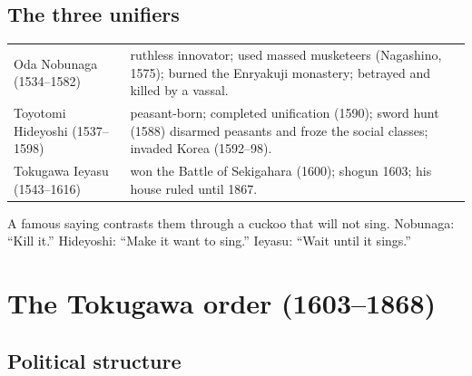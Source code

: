 \subsection{The three unifiers}

\begin{center}
\begin{tabular}{lp{10cm}}
\toprule
Oda Nobunaga (1534--1582) & ruthless innovator; used massed musketeers (Nagashino, 1575);
burned the Enryakuji monastery; betrayed and killed by a vassal. \\
Toyotomi Hideyoshi (1537--1598) & peasant-born; completed unification (1590); sword hunt
(1588) disarmed peasants and froze the social classes; invaded Korea (1592--98). \\
Tokugawa Ieyasu (1543--1616) & won the Battle of Sekigahara (1600); shogun 1603; his
house ruled until 1867. \\
\bottomrule
\end{tabular}
\end{center}

\begin{aside}
A famous saying contrasts them through a cuckoo that will not sing. Nobunaga: ``Kill it.''
Hideyoshi: ``Make it want to sing.'' Ieyasu: ``Wait until it sings.''
\end{aside}

\section{The Tokugawa order (1603--1868)}

\subsection{Political structure}

\begin{center}
\end{center}

